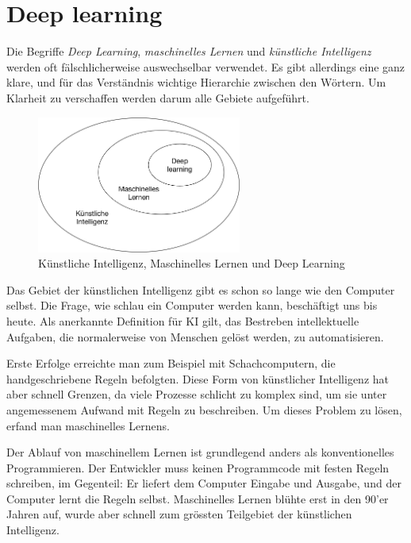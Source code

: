 \section{Deep learning}
Die Begriffe \textit{Deep Learning}, \textit{maschinelles Lernen} und \textit{künstliche Intelligenz} werden oft fälschlicherweise auswechselbar verwendet. Es gibt allerdings eine ganz klare, und für das Verständnis wichtige Hierarchie zwischen den Wörtern. Um Klarheit zu verschaffen werden darum alle Gebiete aufgeführt.

\begin{figure}[hbt]
	\centering
		\includegraphics[width=0.6\textwidth]{assets/hierarchy.png}
	\caption{Künstliche Intelligenz, Maschinelles Lernen und Deep Learning}
	\label{img:hierarchy}
\end{figure}

Das Gebiet der künstlichen Intelligenz gibt es schon so lange wie den Computer selbst. Die Frage, wie schlau ein Computer werden kann, beschäftigt uns bis heute. Als anerkannte Definition für KI gilt, das Bestreben intellektuelle Aufgaben, die normalerweise von Menschen gelöst werden, zu automatisieren.

Erste Erfolge erreichte man zum Beispiel mit Schachcomputern, die handgeschriebene Regeln befolgten. Diese Form von künstlicher Intelligenz hat aber schnell Grenzen, da viele Prozesse schlicht zu komplex sind, um sie unter angemessenem Aufwand mit Regeln zu beschreiben. Um dieses Problem zu lösen, erfand man maschinelles Lernens. 

Der Ablauf von maschinellem Lernen ist grundlegend anders als konventionelles Programmieren. Der Entwickler muss  keinen Programmcode mit festen Regeln schreiben, im Gegenteil: Er liefert dem Computer Eingabe und Ausgabe, und der Computer lernt die Regeln selbst. Maschinelles Lernen blühte erst in den 90'er Jahren auf, wurde aber schnell zum grössten Teilgebiet der künstlichen Intelligenz.

